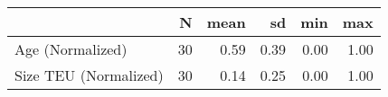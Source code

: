 
\begin{tabular}[t]{lrrrrr}
\toprule
  & N & mean & sd & min & max\\
\midrule
Age (Normalized) & 30 & 0.59 & 0.39 & 0.00 & 1.00\\
Size TEU (Normalized) & 30 & 0.14 & 0.25 & 0.00 & 1.00\\
\bottomrule
\end{tabular}
